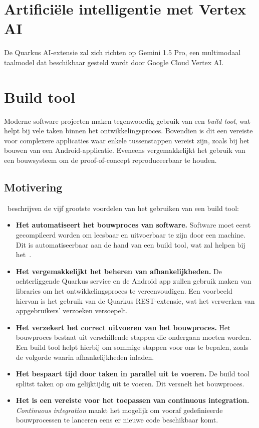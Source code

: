 \section{Artificiële intelligentie met Vertex AI}
\label{sec:keuze-ai-platform}
De Quarkus AI-extensie zal zich richten op Gemini 1.5 Pro, een multimodaal taalmodel dat beschikbaar gesteld wordt door Google Cloud Vertex AI\@.


\section{Build tool}
\label{sec:build-tool}
Moderne software projecten maken tegenwoordig gebruik van een \textit{build tool}, wat helpt bij vele taken binnen het ontwikkelingsproces.
Bovendien is dit een vereiste voor complexere applicaties waar enkele tussenstappen vereist zijn, zoals bij het bouwen van een Android-applicatie.
Eveneens vergemakkelijkt het gebruik van een bouwsysteem om de proof-of-concept reproduceerbaar te houden.

\subsection{Motivering}
\label{subsec:voordelen-van-een-build-tool}
\textcite{Kandhway2019}~beschrijven de vijf grootste voordelen van het gebruiken van een build tool:
\begin{itemize}
    \item \textbf{Het automatiseert het bouwproces van software.}
    Software moet eerst gecompileerd worden om leesbaar en uitvoerbaar te zijn door een machine.
    Dit is automatiseerbaar aan de hand van een build tool, wat zal helpen bij het~.
    \item \textbf{Het vergemakkelijkt het beheren van afhankelijkheden.}
    De achterliggende Quarkus service en de Android app zullen gebruik maken van libraries om het ontwikkelingsproces te vereenvoudigen.
    Een voorbeeld hiervan is het gebruik van de Quarkus REST-extensie, wat het verwerken van appgebruikers' verzoeken versoepelt.
    \item \textbf{Het verzekert het correct uitvoeren van het bouwproces.}
    Het bouwproces bestaat uit verschillende stappen die ondergaan moeten worden.
    Een build tool helpt hierbij om sommige stappen voor ons te bepalen, zoals de volgorde waarin afhankelijkheden inladen.
    \item \textbf{Het bespaart tijd door taken in parallel uit te voeren.}
    De build tool splitst taken op om gelijktijdig uit te voeren.
    Dit versnelt het bouwproces.
    \item \textbf{Het is een vereiste voor het toepassen van continuous integration.}
    \textit{Continuous integration} maakt het mogelijk om vooraf gedefinieerde bouwprocessen te lanceren eens er nieuwe code beschikbaar komt.
\end{itemize}


